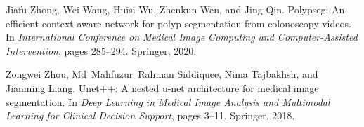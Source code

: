 \documentclass{article}
\begin{document}
\begin{thebibliography}{10}
Jiafu Zhong, Wei Wang, Huisi Wu, Zhenkun Wen, and Jing Qin.
\newblock Polypseg: An efficient context-aware network for polyp segmentation
  from colonoscopy videos.
\newblock In {\em International Conference on Medical Image Computing and
  Computer-Assisted Intervention}, pages 285--294. Springer, 2020.

Zongwei Zhou, Md~Mahfuzur~Rahman Siddiquee, Nima Tajbakhsh, and Jianming Liang.
\newblock Unet++: A nested u-net architecture for medical image segmentation.
\newblock In {\em Deep Learning in Medical Image Analysis and Multimodal
  Learning for Clinical Decision Support}, pages 3--11. Springer, 2018.

\end{thebibliography}
 

\end{document}
